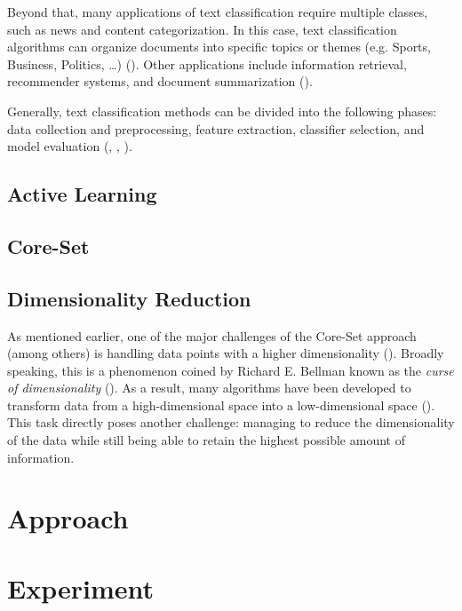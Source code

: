 \documentclass[english,bachelor,lu]{webisthesis} %
\begin{document}
Beyond that, many applications of text classification require multiple classes, such as news and content categorization. In this case, text classification algorithms can organize documents into specific topics or themes (e.g. Sports, Business, Politics, \dots) (\cite{DBLP:journals/csur/Sebastiani02}). Other applications include information retrieval, recommender systems, and document summarization (\cite{DBLP:journals/information/KowsariMHMBB19}).

Generally, text classification methods can be divided into the following phases: data collection and preprocessing, feature extraction, classifier selection, and model evaluation (\cite{DBLP:journals/information/KowsariMHMBB19}, \cite{DBLP:journals/eswa/MironczukP18}, \cite{ikonomakis2005text}).


\section{Active Learning}

\section{Core-Set}

\section{Dimensionality Reduction}

As mentioned earlier, one of the major challenges of the Core-Set approach (among others) is handling data points with a higher dimensionality (\cite{DBLP:conf/iccv/SinhaED19}). Broadly speaking, this is a phenomenon coined by Richard E. Bellman known as the \textit{curse of dimensionality} (\cite{franccois2007high}). As a result, many algorithms have been developed to transform data from a high-dimensional space into a low-dimensional space (\cite{van2009dimensionality}). This task directly poses another challenge: managing to reduce the dimensionality of the data while still being able to retain the highest possible amount of information.

\chapter{Approach}

\chapter{Experiment}
\end{document}
